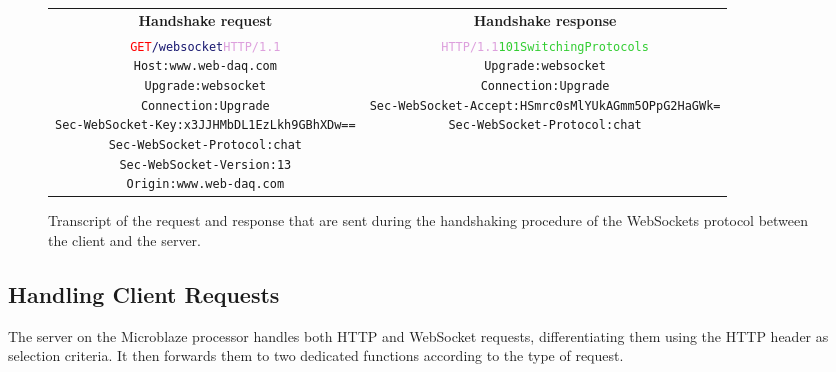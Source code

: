       \begin{figure}[b!]
        \begin{tabularx}{\textwidth}{C{1}C{1}}
          \textbf{Handshake  request} & \textbf{Handshake response} \\
        { \footnotesize
\begin{alltt}
\textcolor{Red}{GET} \textcolor{MidnightBlue}{/websocket} \textcolor{Plum}{HTTP/1.1} \newline
\textcolor{BurntOrange}{Host:} www.web-daq.com \newline
\textcolor{BurntOrange}{Upgrade:} websocket \newline
\textcolor{BurntOrange}{Connection:} Upgrade \newline
\textcolor{BurntOrange}{Sec-WebSocket-Key:} x3JJHMbDL1EzLkh9GBhXDw== \newline
\textcolor{BurntOrange}{Sec-WebSocket-Protocol:} chat \newline
\textcolor{BurntOrange}{Sec-WebSocket-Version:} 13 \newline
\textcolor{BurntOrange}{Origin:} www.web-daq.com
\end{alltt} } & { \footnotesize
\begin{alltt}
\textcolor{Plum}{HTTP/1.1} \textcolor{LimeGreen}{101 Switching Protocols} \newline
\textcolor{BurntOrange}{Upgrade:} websocket \newline
\textcolor{BurntOrange}{Connection:} Upgrade \newline
\textcolor{BurntOrange}{Sec-WebSocket-Accept:} HSmrc0sMlYUkAGmm5OPpG2HaGWk= \newline
\textcolor{BurntOrange}{Sec-WebSocket-Protocol:} chat
\end{alltt} }
        \end{tabularx}
        \caption{Transcript of the request and response that are sent during the handshaking procedure of the WebSockets protocol between the client and the server.}
        \label{fig:III-2-websocket}
      \end{figure}

    \subsection{Handling Client Requests}

      The server on the Microblaze processor handles both HTTP and WebSocket requests, differentiating them using the HTTP header as selection criteria. It then forwards them to two dedicated functions according to the type of request. \\

